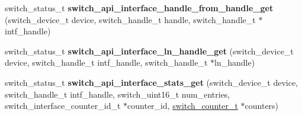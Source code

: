 \begin{DoxyCompactItemize}
\item 
\hypertarget{group__Interface_ga4a20d9b2a350a3bbbc49edfcb25b6898}{switch\+\_\+status\+\_\+t {\bfseries switch\+\_\+api\+\_\+interface\+\_\+handle\+\_\+from\+\_\+handle\+\_\+get} (switch\+\_\+device\+\_\+t device, switch\+\_\+handle\+\_\+t handle, switch\+\_\+handle\+\_\+t $\ast$intf\+\_\+handle)}\label{group__Interface_ga4a20d9b2a350a3bbbc49edfcb25b6898}

\item 
\hypertarget{group__Interface_gade0fb13f1521a0a10638755533ca9304}{switch\+\_\+status\+\_\+t {\bfseries switch\+\_\+api\+\_\+interface\+\_\+ln\+\_\+handle\+\_\+get} (switch\+\_\+device\+\_\+t device, switch\+\_\+handle\+\_\+t intf\+\_\+handle, switch\+\_\+handle\+\_\+t $\ast$ln\+\_\+handle)}\label{group__Interface_gade0fb13f1521a0a10638755533ca9304}

\item 
\hypertarget{group__Interface_ga3fb1c21c04e13a7212ffe89a34df53d5}{switch\+\_\+status\+\_\+t {\bfseries switch\+\_\+api\+\_\+interface\+\_\+stats\+\_\+get} (switch\+\_\+device\+\_\+t device, switch\+\_\+handle\+\_\+t intf\+\_\+handle, switch\+\_\+uint16\+\_\+t num\+\_\+entries, switch\+\_\+interface\+\_\+counter\+\_\+id\+\_\+t $\ast$counter\+\_\+id, \hyperlink{structswitch__counter__s}{switch\+\_\+counter\+\_\+t} $\ast$counters)}\label{group__Interface_ga3fb1c21c04e13a7212ffe89a34df53d5}

\end{DoxyCompactItemize}


